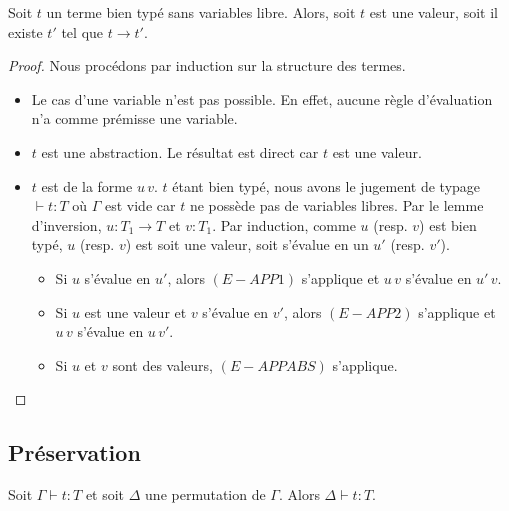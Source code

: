 \begin{theorem} 
  Soit $t$ un terme bien typé sans variables libre. Alors, soit $t$ est une
  valeur, soit il existe $t'$ tel que $t \rightarrow t'$.
\end{theorem}

\begin{proof}
  Nous procédons par induction sur la structure des termes.
  \begin{itemize}
    \item Le cas d'une variable n'est pas possible. En effet, aucune règle
      d'évaluation n'a comme prémisse une variable.
    \item $t$ est une abstraction. Le résultat est direct car $t$ est une valeur.
    \item $t$ est de la forme $u \, v$. $t$ étant
      bien typé, nous avons le jugement de typage $\vdash t : T$ où $\Gamma$ est
      vide car $t$ ne possède pas de variables libres. Par le lemme
      d'inversion, $u : T_{1} \rightarrow T$ et $v : T_{1}$. Par induction,
      comme $u$ (resp. $v$) est bien typé, $u$ (resp. $v$) est soit une valeur,
      soit s'évalue en un $u'$ (resp. $v'$).
      \begin{itemize}
        \item Si $u$ s'évalue en $u'$, alors $(E-APP1)$ s'applique et $u \, v$
          s'évalue en $u' \, v$.
        \item Si $u$ est une valeur et $v$ s'évalue en $v'$, alors $(E-APP2)$
          s'applique et $u \, v$ s'évalue en $u \, v'$.
        \item Si $u$ et $v$ sont des valeurs, $(E-APPABS)$ s'applique.
      \end{itemize}
  \end{itemize}
\end{proof}

\subsection*{Préservation}

\begin{lemma} [de permutation]
  Soit $\Gamma \vdash t : T$ et soit $\Delta$ une permutation de $\Gamma$. Alors
  $\Delta \vdash t : T$.
\end{lemma}

